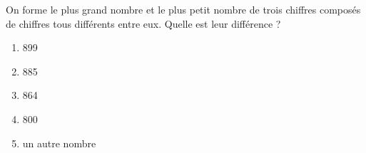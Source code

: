 On forme le plus grand nombre et le plus petit nombre de trois chiffres composés de chiffres tous différents entre eux. Quelle est leur différence ?
\begin{multicols}{5}
  \begin{enumerate}[A/]
  \item 899
  \item 885
  \item 864
  \item 800
  \item un autre nombre
  \end{enumerate}
\end{multicols}